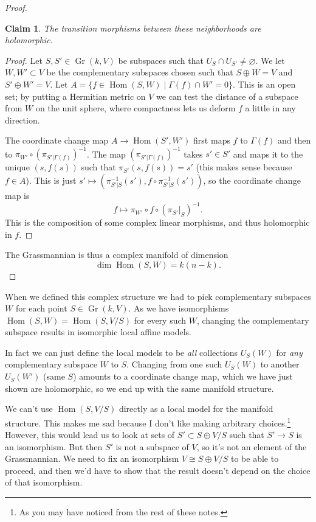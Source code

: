 \documentclass[11pt]{article}
\newtheorem*{claim}{Claim}
\newtheorem*{proof}{Proof}
\def\qedhere{}
\DeclareMathOperator{\Gr}{Gr}
\DeclareMathOperator{\Hom}{Hom}
\begin{document}
\begin{proof}
\begin{claim}
  The transition morphisms between these neighborhoods are holomorphic.
\end{claim}

\begin{proof}
Let $S, S' \in \Gr(k,V)$ be subspaces such that $U_S \cap U_{S'} \not= \varnothing$. We let $W,W' \subset V$ be the complementary subspaces chosen such that $S \oplus W = V$ and $S' \oplus W' = V$. Let $A = \{ f \in \Hom(S, W) \mid \Gamma(f) \cap W' = 0 \}$. This is an open set; by putting a Hermitian metric on $V$ we can test the distance of a subspace from $W$ on the unit sphere, where compactness lets us deform $f$ a little in any direction.

The coordinate change map $A \to \Hom(S',W')$ first maps $f$ to $\Gamma(f)$ and then to $\pi_{W'} \circ (\pi_{S'|\Gamma(f)})^{-1}$. The map $(\pi_{S'|\Gamma(f)})^{-1}$ takes $s' \in S'$ and maps it to the unique $(s, f(s))$ such that $\pi_{S'}(s, f(s)) = s'$ (this makes sense because $f \in A$). This is just $s' \mapsto (\pi_{S'|S}^{-1}(s'), f \circ \pi_{S'|S}^{-1}(s'))$, so the coordinate change map is
$$
f \mapsto \pi_{W'} \circ f \circ (\pi_{S'}|_{S})^{-1}.
$$
This is the composition of some complex linear morphisms, and thus holomorphic in $f$.
\end{proof}

The Grassmannian is thus a complex manifold of dimension
\[
\dim \Hom(S, W) = k (n-k).
\qedhere
\]
\end{proof}

When we defined this complex structure we had to pick complementary subspaces $W$ for each point $S \in \Gr(k,V)$. As we have isomorphisms $\Hom(S, W) = \Hom(S, V/S)$ for every such $W$, changing the complementary subspace results in isomorphic local affine models.

In fact we can just define the local models to be \emph{all} collections $U_S(W)$ for \emph{any} complementary subspace $W$ to $S$. Changing from one such $U_S(W)$ to another $U_S(W')$ (same $S$) amounts to a coordinate change map, which we have just shown are holomorphic, so we end up with the same manifold structure.

We can't use $\Hom(S, V/S)$ directly as a local model for the manifold structure. This makes me sad because I don't like making arbitrary choices.\footnote{As you may have noticed from the rest of these notes.} However, this would lead us to look at sets of $S' \subset S \oplus V/S$ such that $S' \to S$ is an isomorphism. But then $S'$ is not a subspace of $V$, so it's not an element of the Grassmannian. We need to fix an isomorphism $V \cong S \oplus V/S$ to be able to proceed, and then we'd have to show that the result doesn't depend on the choice of that isomorphism.
\end{document}
